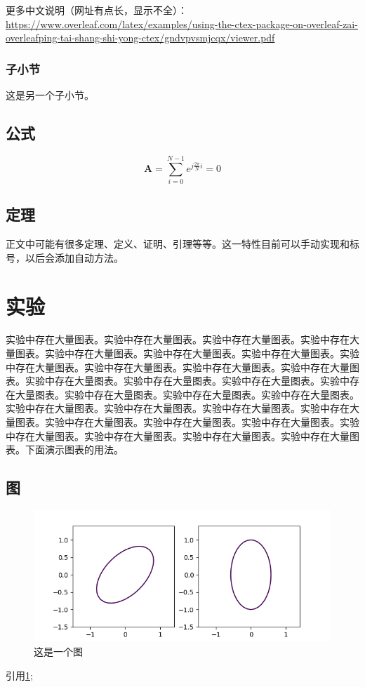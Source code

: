 \documentclass[12pt]{article} %
\begin{document}
更多中文说明（网址有点长，显示不全）：\\\url{https://www.overleaf.com/latex/examples/using-the-ctex-package-on-overleaf-zai-overleafping-tai-shang-shi-yong-ctex/gndvpvsmjcqx/viewer.pdf}

\subsubsection{子小节}
这是另一个子小节。

\subsection{公式}
\begin{equation}
\label{eqn:eqn1}
\mathbf{A}=\sum\limits_{i=0}^{N-1}{e^{j\frac{2\pi}{N}i}}=0
\end{equation}

\subsection{定理}
正文中可能有很多定理、定义、证明、引理等等。这一特性目前可以手动实现和标号，以后会添加自动方法。


\section{实验}
实验中存在大量图表。实验中存在大量图表。实验中存在大量图表。实验中存在大量图表。实验中存在大量图表。实验中存在大量图表。实验中存在大量图表。实验中存在大量图表。实验中存在大量图表。实验中存在大量图表。实验中存在大量图表。实验中存在大量图表。实验中存在大量图表。实验中存在大量图表。实验中存在大量图表。实验中存在大量图表。实验中存在大量图表。实验中存在大量图表。实验中存在大量图表。实验中存在大量图表。实验中存在大量图表。实验中存在大量图表。实验中存在大量图表。实验中存在大量图表。实验中存在大量图表。实验中存在大量图表。实验中存在大量图表。实验中存在大量图表。实验中存在大量图表。下面演示图表的用法。

\subsection{图}
\begin{figure}[ht]
\centering
\includegraphics[width=\textwidth]{canoform.png}
\caption{这是一个图}
\label{fig:fig1}
\end{figure}
引用\ref{fig:fig1};
\end{document}
